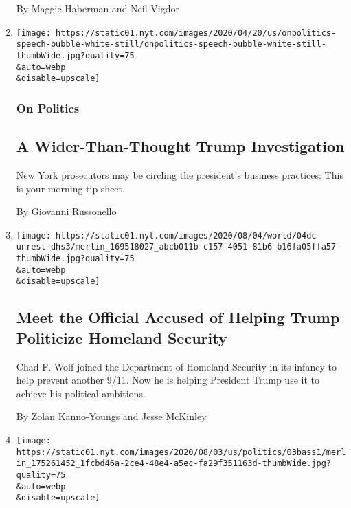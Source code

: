 \begin{enumerate}
  By Maggie Haberman and Neil Vigdor
\item
  \href{/2020/08/04/us/politics/trump-prosecutors.html}{}

  \texttt{[image: https://static01.nyt.com/images/2020/04/20/us/onpolitics-speech-bubble-white-still/onpolitics-speech-bubble-white-still-thumbWide.jpg?quality=75\\\&auto=webp\\\&disable=upscale]}

  \hypertarget{on-politics}{%
  \subsubsection{On Politics}\label{on-politics}}

  \hypertarget{a-wider-than-thought-trump-investigation}{%
  \subsection{A Wider-Than-Thought Trump
  Investigation}\label{a-wider-than-thought-trump-investigation}}

  New York prosecutors may be circling the president's business
  practices: This is your morning tip sheet.

  By Giovanni Russonello
\item
  \href{/2020/08/04/us/politics/trump-homeland-security.html}{}

  \texttt{[image: https://static01.nyt.com/images/2020/08/04/world/04dc-unrest-dhs3/merlin\_169518027\_abcb011b-c157-4051-81b6-b16fa05ffa57-thumbWide.jpg?quality=75\\\&auto=webp\\\&disable=upscale]}

  \hypertarget{meet-the-official-accused-of-helping-trump-politicize-homeland-security-1}{%
  \subsection{Meet the Official Accused of Helping Trump Politicize
  Homeland
  Security}\label{meet-the-official-accused-of-helping-trump-politicize-homeland-security-1}}

  Chad F. Wolf joined the Department of Homeland Security in its infancy
  to help prevent another 9/11. Now he is helping President Trump use it
  to achieve his political ambitions.

  By Zolan Kanno-Youngs and Jesse McKinley
\item
  \href{/2020/08/04/us/politics/karen-bass-vice-president-biden.html}{}

  \texttt{[image: https://static01.nyt.com/images/2020/08/03/us/politics/03bass1/merlin\_175261452\_1fcbd46a-2ce4-48e4-a5ec-fa29f351163d-thumbWide.jpg?quality=75\\\&auto=webp\\\&disable=upscale]}


\end{enumerate}
